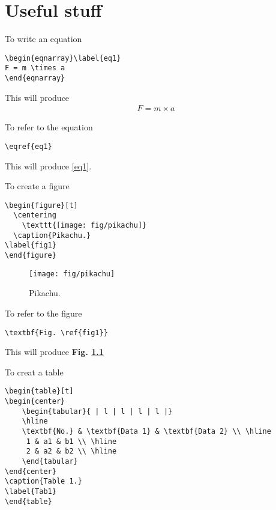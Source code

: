 
\chapter{Useful stuff}



To write an equation
\begin{verbatim}
\begin{eqnarray}\label{eq1}
F = m \times a
\end{eqnarray}
\end{verbatim}
\noindent This will produce
\begin{eqnarray}\label{eq1}
F = m \times a
\end{eqnarray}

\noindent To refer to the equation
\begin{verbatim}
\eqref{eq1}
\end{verbatim}
\noindent This will produce \eqref{eq1}.



To create a figure
\begin{verbatim}
\begin{figure}[t]
  \centering
    \texttt{[image: fig/pikachu]}
  \caption{Pikachu.}
\label{fig1}
\end{figure}
\end{verbatim}

\begin{figure}[t]
  \centering
    \texttt{[image: fig/pikachu]}
 \caption{Pikachu.}
\label{fig1}
\end{figure}

\noindent To refer to the figure
\begin{verbatim}
\textbf{Fig. \ref{fig1}}
\end{verbatim}

\noindent This will produce \textbf{Fig. \ref{fig1}}

To creat a table
\begin{verbatim}
\begin{table}[t]
\begin{center}
    \begin{tabular}{ | l | l | l | l |}
    \hline
    \textbf{No.} & \textbf{Data 1} & \textbf{Data 2} \\ \hline
     1 & a1 & b1 \\ \hline
     2 & a2 & b2 \\ \hline
    \end{tabular}
\end{center}
\caption{Table 1.}
\label{Tab1}
\end{table}
\end{verbatim}

